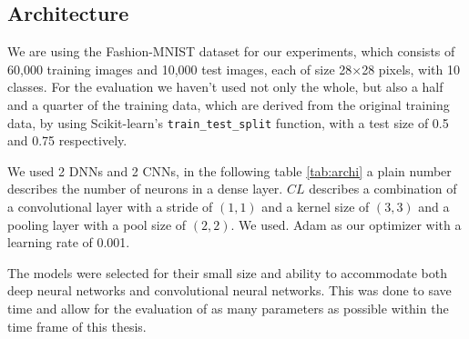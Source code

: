 \subsection{Architecture}\label{subsec:architecture}
We are using the Fashion-MNIST dataset\cite{xiao_fashion-mnist_2017} for our experiments, which consists of 60,000 training images and 10,000 test images, each of size 28×28 pixels, with 10 classes.
For the evaluation we haven't used not only the whole, but also a half and a quarter of the training data, which are derived from the original training data, by using Scikit-learn's\cite{pedregosa_scikit-learn_2011} \texttt{train\_test\_split} function, with a test size of 0.5 and 0.75 respectively.

We used 2 DNNs and 2 CNNs, in the following table \ref{tab:archi} a plain number describes the number of neurons in a dense layer. $CL$ describes a combination of a convolutional layer with a stride of $(1,1)$ and a kernel size of $(3,3)$ and a pooling layer with a pool size of $(2,2)$. We used.
Adam as our optimizer with a learning rate of 0.001.

The models were selected for their small size and ability to accommodate both deep neural networks and convolutional neural networks.
This was done to save time and allow for the evaluation of as many parameters as possible within the time frame of this thesis.

